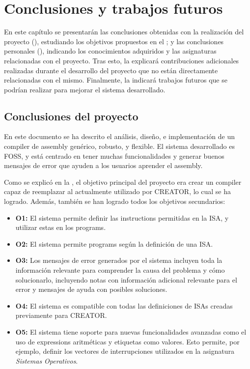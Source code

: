 \chapter{Conclusiones y trabajos futuros}\label{chap:conclusions}

En este capítulo se presentarán las conclusiones obtenidas con la realización
del proyecto (), estudiando los objetivos
propuestos en el ; y las conclusiones personales
(), indicando los conocimientos adquiridos y
las asignaturas relacionadas con el proyecto. Tras esto, la
 explicará contribuciones adicionales
realizadas durante el desarrollo del proyecto que no están directamente
relacionadas con el mismo. Finalmente, la  indicará
trabajos futuros que se podrían realizar para mejorar el sistema desarrollado.

\section{Conclusiones del proyecto}\label{sec:project-conclusions}

En este documento se ha descrito el análisis, diseño, e implementación de un
\gls{compiler} de \gls{assembly} genérico, robusto, y flexible. El sistema
desarrollado es \gls{FOSS}, y está centrado en tener muchas funcionalidades y
generar buenos mensajes de error que ayuden a los usuarios aprender el
\gls{assembly}.

Como se explicó en la , el objetivo principal del
proyecto era crear un \gls{compiler} capaz de reemplazar al actualmente
utilizado por CREATOR, lo cual se ha logrado. Además, también se han logrado
todos los objetivos secundarios:

\begin{itemize}
    \item \textbf{O1:} El sistema permite definir las \glspl{instruction}
    permitidas en la \gls{ISA}, y utilizar estas en los \glspl{program}.
    \item \textbf{O2:} El sistema permite 
    \glspl{program} según la definición de una \gls{ISA}.
    \item \textbf{O3:} Los mensajes de error generados por el sistema incluyen
    toda la información relevante para comprender la causa del problema y cómo
    solucionarlo, incluyendo notas con información adicional relevante para el
    error y mensajes de ayuda con posibles soluciones.
    \item \textbf{O4:} El sistema es compatible con todas las definiciones de
    \glspl{ISA} creadas previamente para CREATOR.
    \item \textbf{O5:} El sistema tiene soporte para nuevas funcionalidades
    avanzadas como el uso de \glspl{expression} aritméticas y etiquetas como
    valores. Esto permite, por ejemplo, definir los vectores de interrupciones
    utilizados en la asignatura \textit{Sistemas Operativos}.
\end{itemize}

